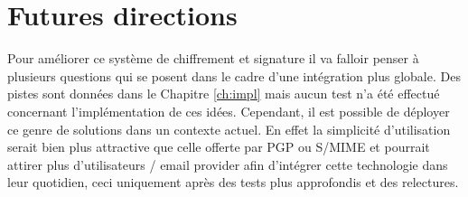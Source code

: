 \section{Futures directions}
Pour améliorer ce système de chiffrement et signature il va falloir penser à plusieurs questions qui se posent dans le cadre d'une intégration plus globale. Des pistes sont données dans le Chapitre \ref{ch:impl} mais aucun test n'a été effectué concernant l'implémentation de ces idées. Cependant, il est possible de déployer ce genre de solutions dans un contexte actuel. En effet la simplicité d'utilisation serait bien plus attractive que celle offerte par PGP ou S/MIME et pourrait attirer plus d'utilisateurs / email provider afin d'intégrer cette technologie dans leur quotidien, ceci uniquement après des tests plus approfondis et des relectures.
 